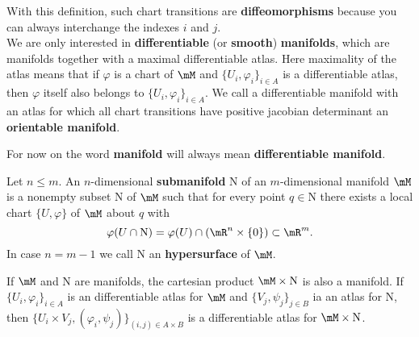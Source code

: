 	With this definition, such chart transitions are \textbf{diffeomorphisms} because you can always interchange the indexes $i$ and $j$.\\



We are only interested in \textbf{differentiable} (or \textbf{smooth}) \textbf{manifolds}, which are manifolds together with a maximal differentiable atlas. Here maximality of the atlas means that if $\varphi$ is a chart of $\mM$ and $\{U_i,\varphi_i\}_{i\in A}$ is a differentiable atlas, then $\varphi$ itself also belongs to $\{U_i,\varphi_i\}_{i\in A}$. We call a differentiable manifold with an atlas for which all chart transitions have positive jacobian determinant an \textbf{orientable manifold}.
\begin{notation}
	For now on the word \textbf{manifold} will always mean \textbf{differentiable manifold}.
\end{notation}


\begin{definition}
	Let $n\leq m$. An $n$-dimensional \textbf{submanifold} $\mathrm{N}$ of an $m$-dimensional manifold $\mM$ is a nonempty subset $\mathrm{N}$ of $\mM$ such that for every point $q\in\mathrm{N}$ there exists a local chart $\{U,\varphi\}$ of $\mM$ about $q$ with
	$$\varphi(U\cap \mathrm{N})=\varphi(U)\cap(\mR^n\times\{0\})\subset\mR^m.$$ In case $n=m-1$ we call $\mathrm{N}$ an \textbf{hypersurface} of $\mM$.
\end{definition}

\begin{example}
	If $\mM$ and $\mathrm{N}$ are manifolds, the cartesian product $\mM\times\mathrm{N}$ is also a manifold. If $\{U_i,\varphi_i\}_{i\in A}$ is an differentiable atlas for $\mM$ and $\{V_j,\psi_j\}_{j\in B}$ ia an atlas for $\mathrm{N}$, then $\big\{U_i\times V_j,(\varphi_i,\psi_j)\big\}_{(i,j)\in A\times B}$ is a differentiable atlas for $\mM\times\mathrm{N}$.
\end{example}

